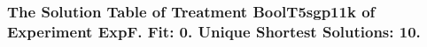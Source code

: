  \begin{frame}
 \fontsize{8pt}{9pt}\selectfont
 \frametitle{ The Solution Table of Treatment BoolT5sgp11k of Experiment ExpF. Fit: 0. Unique Shortest Solutions: 10. }

 \label{ExpFSolutionTable001.tex}  
 \end{frame}

